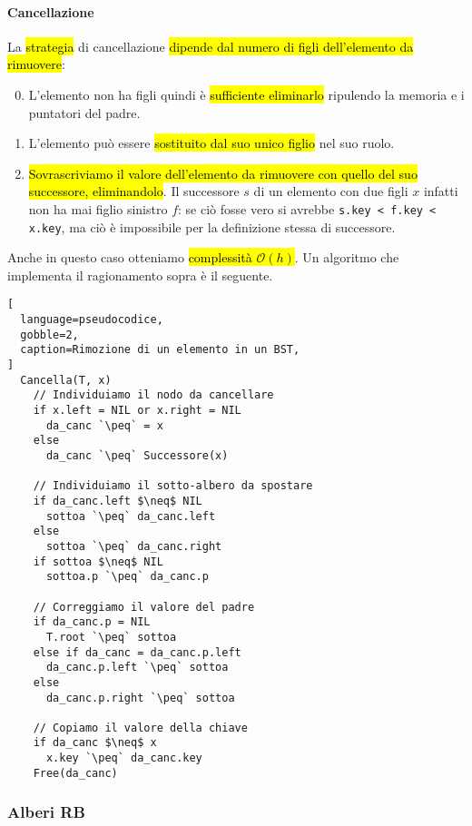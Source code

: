 \documentclass[a4paper,11pt,oneside]{article}
\theoremstyle{plain}
\theoremstyle{definition}
\theoremstyle{remark}
\newcommand{\peq}{$\gets$}
\begin{document}
\paragraph{Cancellazione} La \hl{strategia} di cancellazione \hl{dipende dal
numero di figli dell'elemento da rimuovere}:

\begin{enumerate}
  \setcounter{enumi}{-1}
  \item L'elemento non ha figli quindi è \hl{sufficiente eliminarlo} ripulendo la
    memoria e i puntatori del padre.
  \item L'elemento può essere \hl{sostituito dal suo unico figlio} nel suo
    ruolo.
  \item \hl{Sovrascriviamo il valore dell'elemento da rimuovere con quello del
    suo successore, eliminandolo}. Il successore $s$ di un elemento con due
    figli $x$ infatti non ha mai figlio sinistro $f$: se ciò fosse vero si
    avrebbe \texttt{s.key < f.key < x.key}, ma ciò è impossibile per la
    definizione stessa di successore.
\end{enumerate}

\noindent Anche in questo caso otteniamo \hl{complessità $\mathcal{O}(h)$}. Un
algoritmo che implementa il ragionamento sopra è il seguente.

\begin{lstlisting}[
  language=pseudocodice,
  gobble=2,
  caption=Rimozione di un elemento in un BST,
]
  Cancella(T, x)
    // Individuiamo il nodo da cancellare
    if x.left = NIL or x.right = NIL
      da_canc `\peq` = x
    else
      da_canc `\peq` Successore(x)

    // Individuiamo il sotto-albero da spostare
    if da_canc.left $\neq$ NIL
      sottoa `\peq` da_canc.left
    else
      sottoa `\peq` da_canc.right
    if sottoa $\neq$ NIL
      sottoa.p `\peq` da_canc.p

    // Correggiamo il valore del padre
    if da_canc.p = NIL
      T.root `\peq` sottoa
    else if da_canc = da_canc.p.left
      da_canc.p.left `\peq` sottoa
    else
      da_canc.p.right `\peq` sottoa

    // Copiamo il valore della chiave
    if da_canc $\neq$ x
      x.key `\peq` da_canc.key
    Free(da_canc)
\end{lstlisting}

\subsubsection{Alberi RB}\label{sec:rbt}
\end{document}
